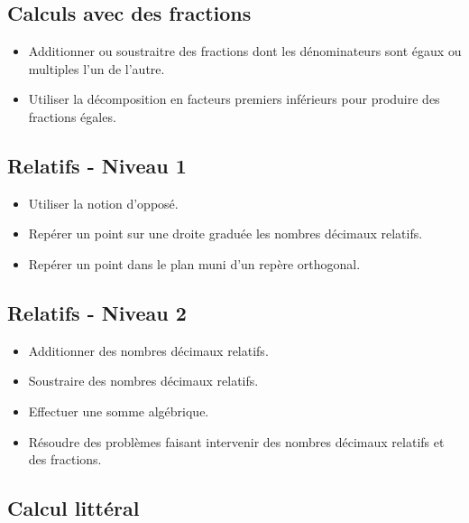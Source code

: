 \documentclass[a4paper,12pt,fleqn]{article}
\begin{document}
\subsection*{Calculs avec des fractions}

\begin{itemize}							
	\item {}	Additionner ou soustraitre des fractions dont les dénominateurs sont égaux ou multiples l’un de l’autre.																								
	\item {}	Utiliser la décomposition en facteurs premiers inférieurs pour produire des fractions égales.	
\end{itemize}

\subsection*{Relatifs - Niveau 1}

\begin{itemize}																								
	\item {}	Utiliser la notion d'opposé.																								
	\item {}	Repérer un point sur une droite graduée les nombres décimaux relatifs.																								
	\item {}	Repérer un point dans le plan muni d’un repère orthogonal.		
\end{itemize}

\subsection*{Relatifs - Niveau 2}

\begin{itemize}																																								
	\item {}	Additionner des nombres décimaux relatifs.																								
	\item {}	Soustraire des nombres décimaux relatifs.
	\item {}	Effectuer une somme algébrique.
	\item {}	Résoudre des problèmes faisant intervenir des nombres décimaux relatifs et des fractions. %
\end{itemize}

\subsection*{Calcul littéral}
\end{document}
